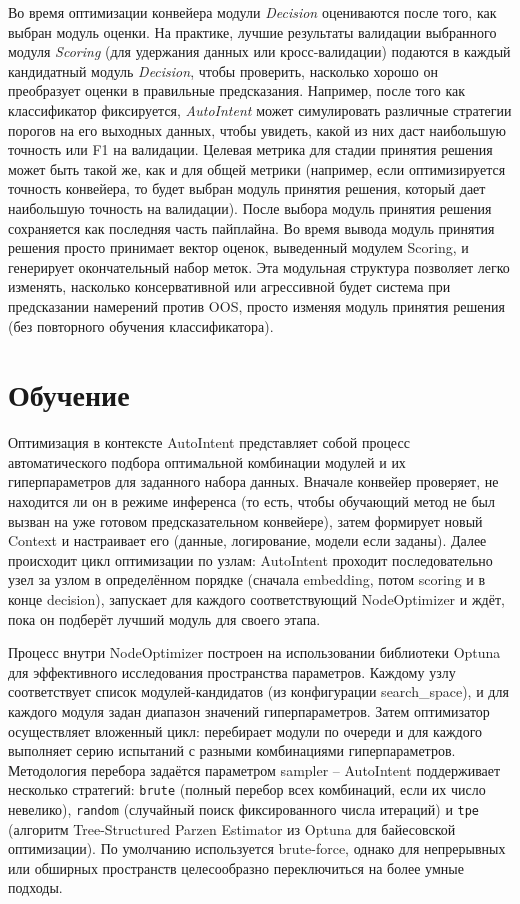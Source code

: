 \documentclass[14pt,a4paper,oneside,openany]{extbook}
\begin{document}
Во время оптимизации конвейера модули \emph{Decision} оцениваются после того, как выбран модуль оценки. На практике, лучшие результаты валидации выбранного модуля \emph{Scoring} (для удержания данных или кросс-валидации) подаются в каждый кандидатный модуль \emph{Decision}, чтобы проверить, насколько хорошо он преобразует оценки в правильные предсказания. Например, после того как классификатор фиксируется, \emph{AutoIntent} может симулировать различные стратегии порогов на его выходных данных, чтобы увидеть, какой из них даст наибольшую точность или F1 на валидации. Целевая метрика для стадии принятия решения может быть такой же, как и для общей метрики (например, если оптимизируется точность конвейера, то будет выбран модуль принятия решения, который дает наибольшую точность на валидации). После выбора модуль принятия решения сохраняется как последняя часть пайплайна. Во время вывода модуль принятия решения просто принимает вектор оценок, выведенный модулем Scoring, и генерирует окончательный набор меток. Эта модульная структура позволяет легко изменять, насколько консервативной или агрессивной будет система при предсказании намерений против OOS, просто изменяя модуль принятия решения (без повторного обучения классификатора).
\section{Обучение}
\label{sec:org4051785}
Оптимизация в контексте AutoIntent представляет собой процесс автоматического подбора оптимальной комбинации модулей и их гиперпараметров для заданного набора данных. Вначале конвейер проверяет, не находится ли он в режиме инференса (то есть, чтобы обучающий метод не был вызван на уже готовом предсказательном конвейере), затем формирует новый Context и настраивает его (данные, логирование, модели если заданы). Далее происходит цикл оптимизации по узлам: AutoIntent проходит последовательно узел за узлом в определённом порядке (сначала embedding, потом scoring и в конце decision), запускает для каждого соответствующий NodeOptimizer и ждёт, пока он подберёт лучший модуль для своего этапа.

Процесс внутри NodeOptimizer построен на использовании библиотеки Optuna\autocite{akiba_optuna_2019a} для эффективного исследования пространства параметров. Каждому узлу соответствует список модулей-кандидатов (из конфигурации search\_space), и для каждого модуля задан диапазон значений гиперпараметров. Затем оптимизатор осуществляет вложенный цикл: перебирает модули по очереди и для каждого выполняет серию испытаний с разными комбинациями гиперпараметров. Методология перебора задаётся параметром sampler – AutoIntent поддерживает несколько стратегий: \texttt{brute} (полный перебор всех комбинаций, если их число невелико), \texttt{random} (случайный поиск фиксированного числа итераций) и \texttt{tpe} (алгоритм Tree-Structured Parzen Estimator из Optuna для байесовской оптимизации). По умолчанию используется brute-force, однако для непрерывных или обширных пространств целесообразно переключиться на более умные подходы.
\end{document}
